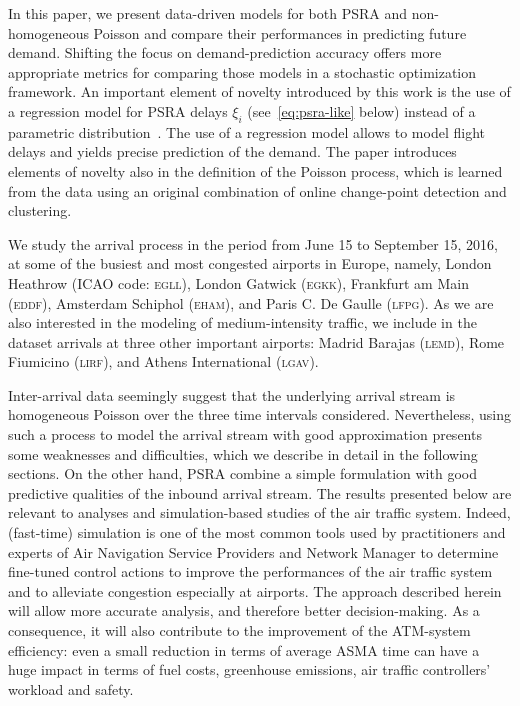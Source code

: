 \documentclass[draft,review]{elsarticle}
\newcommand{\airp}[1]{\textcolor{#1}{\textsc{#1}}}
\begin{document}
In this paper, we present data-driven models for both \ac{PSRA} and non-homo\-geneous Poisson and compare their performances in predicting future demand.
Shifting the focus on demand-prediction accuracy offers more appropriate metrics for comparing those models in a stochastic optimization framework.
An important element of novelty introduced by this work is the use of a regression model for \ac{PSRA} delays \(\xi_i\) (see~\eqref{eq:psra-like} below) instead of a parametric  distribution~\citep{ball1,guadagni2011queueing,nikoleris2012queueing}.
The use of a regression model allows to model flight delays and yields precise prediction of the demand.
The paper introduces elements of novelty also in the definition of the Poisson process, which is learned from the data using an original combination of online change-point detection and clustering.

We study the arrival process in the period from June 15 to September 15, 2016, at some of the busiest and most congested airports in Europe, namely, London Heathrow (\ac{ICAO} code: \airp{egll}), London Gatwick (\airp{egkk}), Frankfurt am Main (\airp{eddf}), Amsterdam Schiphol (\airp{eham}), and Paris C. De Gaulle (\airp{lfpg}).
As we are also interested in the modeling of medium-intensity traffic, we include in the dataset arrivals at three other important airports: Madrid Barajas (\airp{lemd}), Rome Fiumicino (\airp{lirf}), and Athens International (\airp{lgav}).

Inter-arrival data seemingly suggest that the underlying arrival stream is homogeneous Poisson over the three time intervals considered.
Nevertheless, using such a process to model the arrival stream with good approximation presents some weaknesses and difficulties, which we describe in detail in the following sections.
On the other hand, \ac{PSRA} combine a simple formulation with good predictive qualities of the inbound arrival stream.
The results presented below are relevant to analyses and simulation-based studies of the air traffic system.
Indeed, (fast-time) simulation is one of the most common tools used by practitioners and experts of Air Navigation Service Providers and Network Manager to determine fine-tuned control actions to improve the performances of the air traffic system and to alleviate congestion especially at airports.
The approach described herein will allow more accurate analysis, and therefore better decision-making.
As a consequence, it will also contribute to the improvement of the ATM-system efficiency: even a small reduction in terms of average \ac{ASMA} time can have a huge impact in terms of fuel costs, greenhouse emissions, air traffic controllers' workload and safety.
\end{document}

